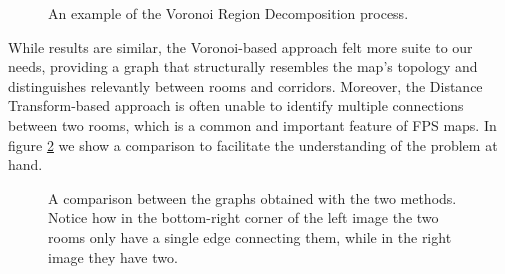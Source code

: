 \documentclass{Configuration_Files/PoliMi3i_thesis}
\begin{document}
\begin{figure}[hbt!]
    \qquad
    
    \caption[Voronoi Region Decomposition example]{An example of the Voronoi Region Decomposition process.}
    \label{fig:voronoi_region_decomposition}
\end{figure}

While results are similar, the Voronoi-based approach felt more suite to our needs, providing a graph that structurally resembles the map's topology and distinguishes relevantly between rooms and corridors. Moreover, the Distance Transform-based approach is often unable to identify multiple connections between two rooms, which is a common and important feature of FPS maps. In figure \ref{fig:graph_comparison} we show a comparison to facilitate the understanding of the problem at hand.

\begin{figure}[hbt!]
    \centering
    \qquad
    \caption[Graph comparison]{A comparison between the graphs obtained with the two methods. Notice how in the bottom-right corner of the left image the two rooms only have a single edge connecting them, while in the right image they have two.}
    \label{fig:graph_comparison}
\end{figure}
\end{document}
